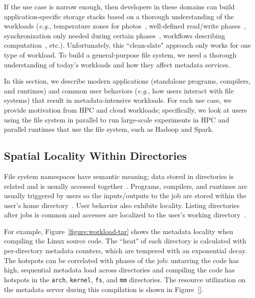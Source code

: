 If the use case is narrow enough, then developers in these domains can build
application-specific storage stacks based on a thorough understanding of the
workloads ({\it e.g.}, temperature zones for
photos~\cite{muralidhar:osdi2014-f4}, well-defined read/write
phases~\cite{dean:osdi2004-mapreduce, dean_evolution_2010}, synchronization
only needed during certain phases~\cite{hakimzadeh:dais14-hdfs-consistency,
zheng:pdsw2015-deltafs}, workflows describing computation~\cite{yoo_slurm_2003,
gamblin_spack_2015}, etc.). Unfortunately, this ``clean-slate" approach only
works for one type of workload. To build a general-purpose file system, we need
a thorough understanding of today's workloads and how they affect metadata
services.  

In this section, we describe modern applications (standalone programs,
compilers, and runtimes) and common user behaviors ({\it e.g.}, how users
interact with file systems) that result in metadata-intensive workloads.  For
each use case, we provide motivation from HPC and cloud workloads;
specifically, we look at users using the file system in parallel to run
large-scale experiments in HPC and parallel runtimes that use the file system,
such as Hadoop and Spark. 

\subsection{Spatial Locality Within Directories}
\label{sec:spatial-locality-within-directories}

File system namespaces have semantic meaning; data stored in directories is
related and is usually accessed together~\cite{weil:osdi2006-ceph,
weil:sc2004-dyn-metadata}.  Programs, compilers, and runtimes are usually
triggered by users so the inputs/outputs to the job are stored within the
user's home directory~\cite{weil:phdthesis07}.  User behavior also exhibits
locality. Listing directories after jobs is common and accesses are localized
to the user's working directory~\cite{roselli:atec2000-FS-workloads,
abad:ucc2012-mimesis}.

For example, Figure~\ref{figure:workload-tar} shows the metadata locality when
compiling the Linux source code. The ``heat" of each directory is calculated
with per-directory metadata counters, which are tempered with an exponential
decay.  The hotspots can be correlated with phases of the job: untarring the
code has high, sequential metadata load across directories and compiling the
code has hotspots in the \texttt{arch}, \texttt{kernel}, \texttt{fs}, and
\texttt{mm} directories. The resource utilization on the metadata server during
this compilation is shown in Figure~\ref{}. 

